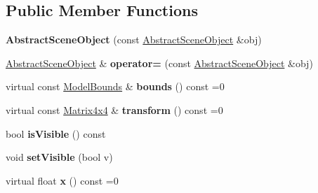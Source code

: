\subsection*{Public Member Functions}
\begin{DoxyCompactItemize}
\item 
\hypertarget{class_tempest_1_1_abstract_scene_object_accb054d8782d5a95b4e0f226bb1764ab}{{\bfseries Abstract\+Scene\+Object} (const \hyperlink{class_tempest_1_1_abstract_scene_object}{Abstract\+Scene\+Object} \&obj)}\label{class_tempest_1_1_abstract_scene_object_accb054d8782d5a95b4e0f226bb1764ab}

\item 
\hypertarget{class_tempest_1_1_abstract_scene_object_a8fedce6cff933e8e6a30d75e9aeba21b}{\hyperlink{class_tempest_1_1_abstract_scene_object}{Abstract\+Scene\+Object} \& {\bfseries operator=} (const \hyperlink{class_tempest_1_1_abstract_scene_object}{Abstract\+Scene\+Object} \&obj)}\label{class_tempest_1_1_abstract_scene_object_a8fedce6cff933e8e6a30d75e9aeba21b}

\item 
\hypertarget{class_tempest_1_1_abstract_scene_object_a0bbfe890cd7669613461f7ecccbf8e16}{virtual const \hyperlink{struct_tempest_1_1_model_bounds}{Model\+Bounds} \& {\bfseries bounds} () const =0}\label{class_tempest_1_1_abstract_scene_object_a0bbfe890cd7669613461f7ecccbf8e16}

\item 
\hypertarget{class_tempest_1_1_abstract_scene_object_a5a73eb01bcf835bb1b3fc674cea393f2}{virtual const \hyperlink{class_tempest_1_1_matrix4x4}{Matrix4x4} \& {\bfseries transform} () const =0}\label{class_tempest_1_1_abstract_scene_object_a5a73eb01bcf835bb1b3fc674cea393f2}

\item 
\hypertarget{class_tempest_1_1_abstract_scene_object_af9ed012dd9e5ffabb91bc677240eca96}{bool {\bfseries is\+Visible} () const }\label{class_tempest_1_1_abstract_scene_object_af9ed012dd9e5ffabb91bc677240eca96}

\item 
\hypertarget{class_tempest_1_1_abstract_scene_object_a0c442c68760482b77be088ff26f20ec1}{void {\bfseries set\+Visible} (bool v)}\label{class_tempest_1_1_abstract_scene_object_a0c442c68760482b77be088ff26f20ec1}

\item 
\hypertarget{class_tempest_1_1_abstract_scene_object_ad3257a9d87ac338a0d4b5ce66aba56a3}{virtual float {\bfseries x} () const =0}\label{class_tempest_1_1_abstract_scene_object_ad3257a9d87ac338a0d4b5ce66aba56a3}


\end{DoxyCompactItemize}
